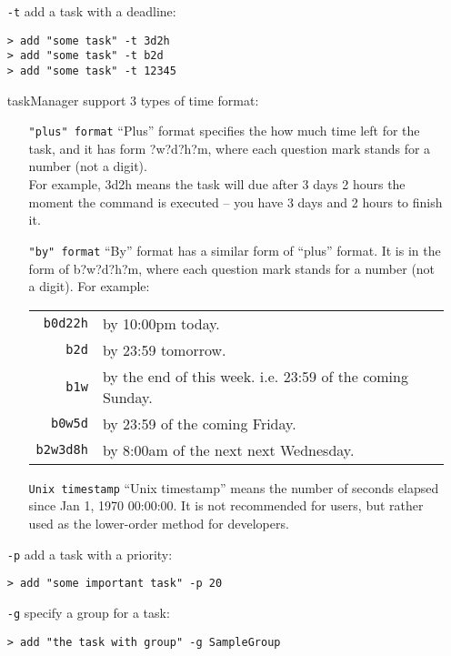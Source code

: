 \documentclass[12pt, a4paper]{article}
\begin{document}
\begin{enumerate}
\item [ \texttt{-t} ] add a task with a deadline:

  \texttt{\textgreater \ add "some task" -t 3d2h\\
    \textgreater \ add "some task" -t b2d\\
    \textgreater \ add "some task" -t 12345}

  taskManager support 3 types of time format:

\begin{enumerate}
\item[ \texttt{"plus" format} ]
  ``Plus'' format specifies the how much time left for the task, and it has form ?w?d?h?m\footnotemark, where each question mark stands for a number (not a digit).\\
  For example, 3d2h means the task will due after 3 days 2 hours the moment the command is executed -- you have 3 days and 2 hours to finish it.


\item[ \texttt{"by" format} ]
  ``By'' format has a similar form of ``plus'' format. It is in the form of b?w?d?h?m\footnotemark, where each question mark stands for a number (not a digit). For example:

  \begin{tabular}{ r | l }
    \texttt{b0d22h} & by 10:00pm today.\\
    \texttt{b2d} & by 23:59 tomorrow.\\
    \texttt{b1w} & by the end of this week. i.e. 23:59 of the coming Sunday. \\
    \texttt{b0w5d} & by 23:59 of the coming Friday.\\
    \texttt{b2w3d8h} & by 8:00am of the next next Wednesday.\\
  \end{tabular}

\item[ \texttt{Unix timestamp} ]
``Unix timestamp'' means the number of seconds elapsed since Jan 1, 1970 00:00:00. It is not recommended for users, but rather used as the lower-order method for developers.
\end{enumerate}

\item[ \texttt{-p} ] add a task with a priority:

\texttt{\textgreater \ add "some important task" -p 20}

\item[ \texttt{-g} ] specify a group for a task:

\texttt{\textgreater \ add "the task with group"\footnotemark \  -g SampleGroup}
\end{enumerate}
\end{document}
